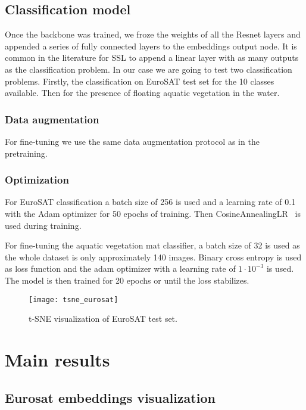 \documentclass[conference]{IEEEtran}
\begin{document}
    \subsection{Classification model}
    Once the backbone was trained, we froze the weights of all the Resnet layers and appended a series of fully connected layers to the embeddings output node.
    It is common in the literature for SSL to append a linear layer with as many outputs as the classification problem.
    In our case we are going to test two classification problems.
    Firstly, the classification on EuroSAT test set for the 10 classes available.
    Then for the presence of floating aquatic vegetation in the water.

    \subsubsection{Data augmentation}
    For fine-tuning we use the same data augmentation protocol as in the pretraining.

    \subsubsection{Optimization}
    For EuroSAT classification a batch size of 256 is used and a learning rate of 0.1 with the Adam optimizer for 50 epochs of training.
    Then CosineAnnealingLR~\cite{loshchilov2017sgdr} is used during training.

    For fine-tuning the aquatic vegetation mat classifier, a batch size of 32 is used as the whole dataset is only approximately 140 images.
    Binary cross entropy is used as loss function and the adam optimizer with a learning rate of $1\cdot10^{-3}$ is used.
    The model is then trained for 20 epochs or until the loss stabilizes.


    \begin{figure}[t]
        \centering
        \texttt{[image: tsne\_eurosat]}
        \caption{t-SNE visualization of EuroSAT test set.}
        \label{fig:tsne_eurosat}
    \end{figure}


    \section{Main results}

    \subsection{Eurosat embeddings visualization}
\end{document}
